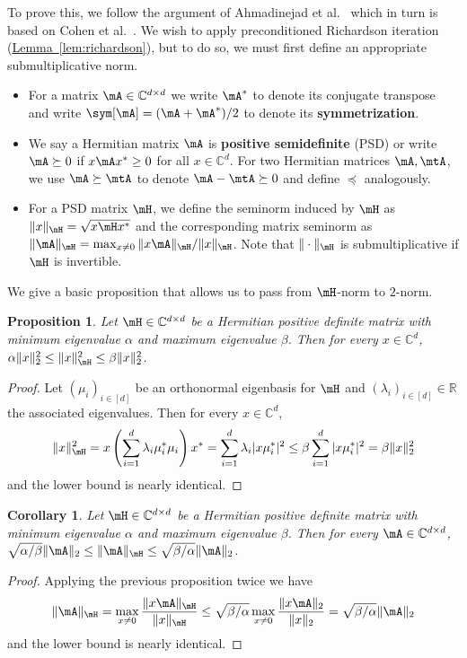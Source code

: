\documentclass[11pt]{article}
\newcommand{\expref}[2]{\texorpdfstring{\hyperref[#2]{#1~\ref{#2}}}{#1~\ref{#2}}}
\newtheorem{corollary}[theorem]{Corollary}
\newtheorem{proposition}[theorem]{Proposition}
\newcommand{\R}{{\mathbb R}}
\newcommand{\C}{{\mathbb C}}
\begin{document}
To prove this, we follow the argument of %
Ahmadinejad %
et al.~\cite{AhmadinejadKeMuPeSiVa19} which in turn is based on Cohen et al.~\cite{CKPPRSV17}. We wish to apply preconditioned Richardson iteration (\expref{Lemma}{lem:richardson}), but to do so, we must first define an appropriate submultiplicative
%
norm. 
\begin{itemize}
        \item For a matrix $\mA \in \C^{d \times d}$ we write $\mA^*$ to denote its conjugate transpose and write $\sym[\mA]=(\mA+\mA^*)/2$ to denote its \textbf{symmetrization}.
        \item We say a Hermitian matrix $\mA$ is \textbf{positive semidefinite} (PSD) or write $\mA \succeq 0$ if $x\mA x^*\geq 0$ for all $x \in \C^d$. For two Hermitian matrices $\mA, \mtA$, we use $\mA\succeq \mtA$ to denote $\mA-\mtA\succeq 0$ and define $\preceq$ analogously.
        \item For a PSD matrix $\mH$, we define the seminorm induced by $\mH$ as $\|x\|_\mH=\sqrt{x\mH x^*}$ and the corresponding matrix seminorm as $\|\mA\|_{\mH} = \max_{x\neq 0}\|x\mA \|_{\mH}/\|x\|_{\mH}$. Note that $\|\cdot\|_{\mH}$ is submultiplicative if $\mH$ is invertible. 
    \end{itemize}
    We give a basic proposition that allows us to pass from $\mH$-norm to $2$-norm.
    \begin{proposition}
        Let $\mH\in \C^{d\times d}$ be a Hermitian positive definite matrix with minimum eigenvalue $\alpha$ and maximum eigenvalue $\beta$. Then for every $x \in \C^d$, $\alpha \|x\|_2^2\leq \|x\|^2_\mH\leq \beta\|x\|_2^2$.
    \end{proposition}
    \begin{proof}
    Let $(\mu_i)_{i\in[d]}$ be an orthonormal eigenbasis for $\mH$ and $(\lambda_i)_{i\in [d]} \in \R$ the associated eigenvalues. Then for every $x\in \C^d$,  
    \[\|x\|^2_\mH = x\left(\sum_{i=1}^d\lambda_i\mu_i^*\mu_i\right)x^*  = \sum_{i=1}^d \lambda_i |x\mu_i^*|^2 \leq \beta \sum_{i=1}^d |x\mu_i^*|^2=\beta \|x\|_2^2\]
    and the lower bound is nearly identical.
    \end{proof}
    \begin{corollary}\label{prop:condNumber}
        Let $\mH\in \C^{d\times d}$ be a Hermitian positive definite matrix with minimum eigenvalue $\alpha$ and maximum eigenvalue $\beta$. Then for every $\mA \in \C^{d\times d}$, $\sqrt{\alpha/\beta}\|\mA\|_2\leq \|\mA\|_\mH\leq \sqrt{\beta/\alpha}\|\mA\|_2$.
    \end{corollary}
    \begin{proof}
    Applying the previous proposition twice we have
    \[\|\mA\|_{\mH} = \max_{x\neq 0}\frac{\|x\mA\|_{\mH}}{\|x\|_{\mH}}\leq \sqrt{\beta/\alpha}\max_{x\neq 0}\frac{\|x\mA\|_2}{\|x\|_2} = \sqrt{\beta/\alpha}\|\mA\|_2\]
    and the lower bound is nearly identical.
    \end{proof}
    
\end{document}
